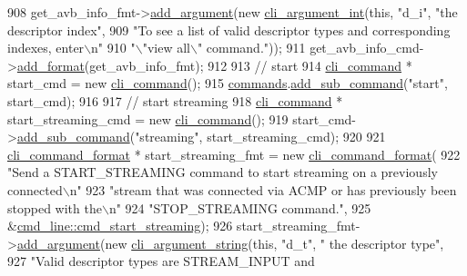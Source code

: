 \begin{DoxyCode}
908     get\_avb\_info\_fmt->\hyperlink{classcli__command__format_ac3fc6d13a227c195d5ee6f7b78eba9cd}{add\_argument}(\textcolor{keyword}{new} \hyperlink{classcli__argument__int}{cli\_argument\_int}(\textcolor{keyword}{this}, \textcolor{stringliteral}{"d\_i"}, \textcolor{stringliteral}{"the
       descriptor index"},
909                                                         \textcolor{stringliteral}{"To see a list of valid descriptor types and
       corresponding indexes, enter\(\backslash\)n"}
910                                                         \textcolor{stringliteral}{"\(\backslash\)"view all\(\backslash\)" command."}));
911     get\_avb\_info\_cmd->\hyperlink{classcli__command_aa9ec38e761644d946f8db2b920e39921}{add\_format}(get\_avb\_info\_fmt);
912 
913     \textcolor{comment}{// start}
914     \hyperlink{classcli__command}{cli\_command} * start\_cmd = \textcolor{keyword}{new} \hyperlink{classcli__command}{cli\_command}();
915     \hyperlink{classcmd__line_ae4fea670c2fdd2b60f7b5b6ad6fbaf1e}{commands}.\hyperlink{classcli__command_aa73a67e8ebb6facd4b40ced66279b226}{add\_sub\_command}(\textcolor{stringliteral}{"start"}, start\_cmd);
916 
917     \textcolor{comment}{// start streaming}
918     \hyperlink{classcli__command}{cli\_command} * start\_streaming\_cmd = \textcolor{keyword}{new} \hyperlink{classcli__command}{cli\_command}();
919     start\_cmd->\hyperlink{classcli__command_aa73a67e8ebb6facd4b40ced66279b226}{add\_sub\_command}(\textcolor{stringliteral}{"streaming"}, start\_streaming\_cmd);
920 
921     \hyperlink{classcli__command__format}{cli\_command\_format} * start\_streaming\_fmt = \textcolor{keyword}{new} 
      \hyperlink{classcli__command__format}{cli\_command\_format}(
922         \textcolor{stringliteral}{"Send a START\_STREAMING command to start streaming on a previously connected\(\backslash\)n"}
923         \textcolor{stringliteral}{"stream that was connected via ACMP or has previously been stopped with the\(\backslash\)n"}
924         \textcolor{stringliteral}{"STOP\_STREAMING command."},
925         &\hyperlink{classcmd__line_a576203de7a50eaf2deda5b7c7ed8ee86}{cmd\_line::cmd\_start\_streaming});
926     start\_streaming\_fmt->\hyperlink{classcli__command__format_ac3fc6d13a227c195d5ee6f7b78eba9cd}{add\_argument}(\textcolor{keyword}{new} \hyperlink{classcli__argument__string}{cli\_argument\_string}(\textcolor{keyword}{this}, \textcolor{stringliteral}{"d\_t"}, \textcolor{stringliteral}{"
      the descriptor type"},
927                                                               \textcolor{stringliteral}{"Valid descriptor types are STREAM\_INPUT and
}
\end{DoxyCode}
